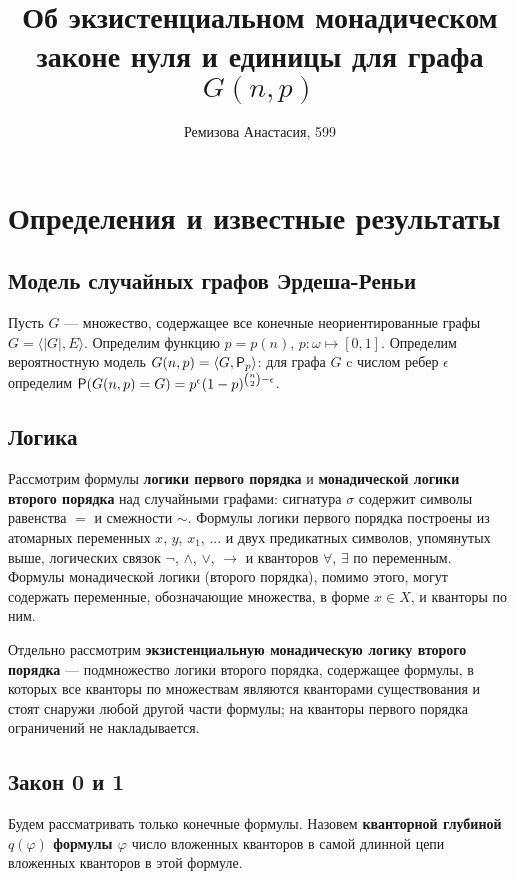 \documentclass{article}
\title{Об экзистенциальном монадическом законе нуля и единицы для графа $G(n, p)$}
\author{Ремизова Анастасия, 599}
\begin{document}
	
	\maketitle
	
	\section{Определения и известные результаты}
	
	\subsection{Модель случайных графов Эрдеша-Реньи}
	
	Пусть ${G}$ --- множество, содержащее все конечные неориентированные графы $G = \langle |G|, E\rangle$. Определим функцию $p= p(n)$, $p: \omega \mapsto [0, 1]$. Определим вероятностную модель  ${G}(n, p) = \langle {G}, {\sf P}_p \rangle$: для графа $G$ c числом ребер $\epsilon$ определим ${\sf P}({G}(n, p) = G) = p^{\epsilon}(1-p)^{{n \choose 2} - \epsilon}$.
	
	\subsection{Логика}
	
	Рассмотрим формулы {\bf логики первого порядка} и {\bf монадической логики второго порядка} над случайными графами: сигнатура $\sigma$ содержит символы равенства $=$ и смежности $\sim$. Формулы логики первого порядка построены из атомарных переменных $x$, $y$, $x_1$, ... и двух предикатных символов, упомянутых выше, логических связок $\neg$, $\land$, $\lor$, $\rightarrow$ и кванторов $\forall$, $\exists$ по переменным. Формулы монадической логики (второго порядка), помимо этого, могут содержать переменные, обозначающие множества, в форме $x \in X$, и кванторы по ним.
	
	Отдельно рассмотрим {\bf экзистенциальную монадическую логику второго порядка} --- подмножество логики второго порядка, содержащее формулы, в которых все кванторы по множествам являются кванторами существования и стоят снаружи любой другой части формулы; на кванторы первого порядка ограничений не накладывается.
	
	\subsection{Закон 0 и 1}
	
	Будем рассматривать только конечные формулы. Назовем {\bf кванторной глубиной $q(\varphi)$ формулы $\varphi$} число вложенных кванторов в самой длинной цепи вложенных кванторов в этой формуле.
	
\end{document}
